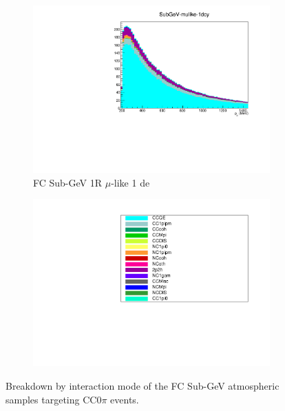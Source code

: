 \begin{figure}[ht]
\begin{subfigure}[t]{0.49\textwidth}
    \includegraphics[width=\textwidth, trim= 0 0 0 30, clip]{Figures/Selections/AtmosphericByMode/SubGeV-mulike-1dcy_LepMom.pdf}
    \caption{FC Sub-GeV 1R $\mu$-like 1 de}
    \end{subfigure}
    \begin{subfigure}[t]{0.49\textwidth}
    \includegraphics[page=1,width=\textwidth, trim= 0 0 0 30, clip]{Figures/Selections/AtmosphericByMode/Legend.pdf}
    \end{subfigure}
    \caption{Breakdown by interaction mode of the FC Sub-GeV atmospheric samples targeting CC0$\pi$ events.}
    \label{fig:SKSamples:FCSubGeVCC0pi}
\end{figure}

